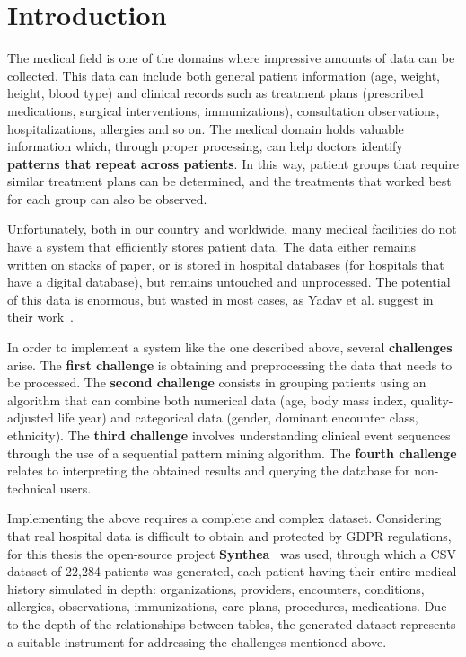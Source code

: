 \chapter{Introduction}\label{ch:introduction}

\pagestyle{fancy}

The medical field is one of the domains where impressive amounts of data can be collected. This data can include both general patient information (age, weight, height, blood type) and clinical records such as treatment plans (prescribed medications, surgical interventions, immunizations), consultation observations, hospitalizations, allergies and so on. The medical domain holds valuable information which, through proper processing, can help doctors identify \textbf{patterns that repeat across patients}. In this way, patient groups that require similar treatment plans can be determined, and the treatments that worked best for each group can also be observed.

Unfortunately, both in our country and worldwide, many medical facilities do not have a system that efficiently stores patient data. The data either remains written on stacks of paper, or is stored in hospital databases (for hospitals that have a digital database), but remains untouched and unprocessed. The potential of this data is enormous, but wasted in most cases, as Yadav et al. suggest in their work~\cite{Yadav2018MiningEHR}.

In order to implement a system like the one described above, several \textbf{challenges} arise. The \textbf{first challenge} is obtaining and preprocessing the data that needs to be processed. The \textbf{second challenge} consists in grouping patients using an algorithm that can combine both numerical data (age, body mass index, quality-adjusted life year) and categorical data (gender, dominant encounter class, ethnicity). The \textbf{third challenge} involves understanding clinical event sequences through the use of a sequential pattern mining algorithm. The \textbf{fourth challenge} relates to interpreting the obtained results and querying the database for non-technical users.

Implementing the above requires a complete and complex dataset. Considering that real hospital data is difficult to obtain and protected by GDPR regulations, for this thesis the open-source project \textbf{Synthea}~\cite{Walonoski2018Synthea} was used, through which a CSV dataset of 22,284 patients was generated, each patient having their entire medical history simulated in depth: organizations, providers, encounters, conditions, allergies, observations, immunizations, care plans, procedures, medications. Due to the depth of the relationships between tables, the generated dataset represents a suitable instrument for addressing the challenges mentioned above.

